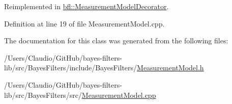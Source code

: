 Reimplemented in \mbox{\hyperlink{classbfl_1_1MeasurementModelDecorator_a531a891152d7bf83e56370664d54f42f}{bfl\+::\+Measurement\+Model\+Decorator}}.



Definition at line 19 of file Measurement\+Model.\+cpp.



The documentation for this class was generated from the following files\+:\begin{DoxyCompactItemize}
\item 
/\+Users/\+Claudio/\+Git\+Hub/bayes-\/filters-\/lib/src/\+Bayes\+Filters/include/\+Bayes\+Filters/\mbox{\hyperlink{MeasurementModel_8h}{Measurement\+Model.\+h}}\item 
/\+Users/\+Claudio/\+Git\+Hub/bayes-\/filters-\/lib/src/\+Bayes\+Filters/src/\mbox{\hyperlink{MeasurementModel_8cpp}{Measurement\+Model.\+cpp}}\end{DoxyCompactItemize}
